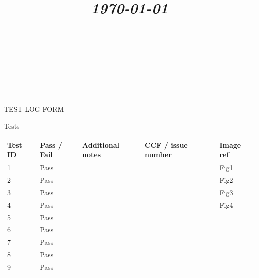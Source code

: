 \documentclass{article}
\title{
	\vspace{1.2in}
	\textmd{\textbf{\doctitle}} \\
	\vspace{0.1in}\large{\textit{\today}} \\
	\vspace{0.4in}
	{\bf{\qanumber}} \\ \vspace{0.4in} %
	\version \\
	\status \\
	\vspace{0.4in}
}
\author{\authors}
\date{}
\begin{document}
	\maketitle
	\newpage
	\tableofcontents
	\newpage

	\begin{section}{TEST LOG FORM}
		\begin{subsection}{Tests}
			\begin{tabularx}{\linewidth}{| p{1.5cm} | p{2cm} | p{7.5cm} | p{2cm} | X |}
				\hline
				\bf{Test ID} & \bf{Pass / Fail} & \bf{Additional notes} & \bf{CCF / issue number} & \bf{Image ref}\\
				\hline
1
&
Pass
&

&

&
Fig1
\\
\hline

2
&
Pass
&

&

&
Fig2
\\
\hline 

3
&
Pass
&

&

&
Fig3
\\
\hline

4
&
Pass
&

&

&
Fig4
\\
\hline

5
&
Pass
&

&

&

\\
\hline

6
&
Pass
&

&

&

\\
\hline

7
&
Pass
&

&

&

\\
\hline

8
&
Pass
&

&

&

\\
\hline

9
&
Pass
&

&

&


\end{tabularx}
\end{subsection}
\end{section}
\end{document}
